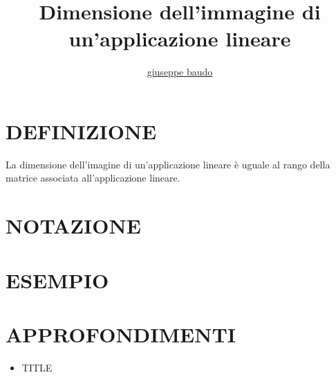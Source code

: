 \documentclass[a4paper,10pt]{article}
\title{Dimensione dell'immagine di un'applicazione lineare}
\author{\href{http://www.baudo.hol.es}{giuseppe baudo}}
\begin{document}
\maketitle

\section{DEFINIZIONE}
La dimensione dell'imagine di un'applicazione lineare è uguale al rango 
della matrice associata all'applicazione lineare.

\section{NOTAZIONE}

\section{ESEMPIO}

\section{APPROFONDIMENTI}
\begin{itemize}
 \item TITLE
\end{itemize}
\end{document}
